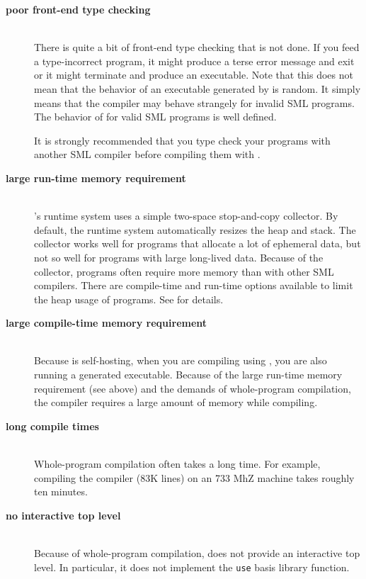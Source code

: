
\newcommand{\drawback}[1]{\item[\bf #1]\hspace{1in}\\}

\begin{description}

\drawback{poor front-end type checking}
There is quite a bit of front-end type checking that is not done.  If
you feed {\mlton} a type-incorrect program, it might produce a terse
error message and exit or it might terminate and produce an
executable.  Note that this does not mean that the behavior of an
executable generated by {\mlton} is random.  It simply means that the
compiler may behave strangely for invalid SML programs.  The behavior
of {\mlton} for valid SML programs is well defined.

It is strongly recommended that you type check your programs with
another SML compiler before compiling them with {\mlton}.

\drawback{large run-time memory requirement}
{\mlton}'s runtime system uses a simple two-space stop-and-copy
collector.  By default, the runtime system automatically resizes the
heap and stack.  The collector works well for programs that allocate a
lot of ephemeral data, but not so well for programs with large
long-lived data.  Because of the collector, programs often require
more memory than with other SML compilers.  There are compile-time and
run-time options available to limit the heap usage of programs.  See
 for details.

\drawback{large compile-time memory requirement}
Because {\mlton} is self-hosting, when you are compiling using
{\mlton}, you are also running a {\mlton} generated executable.
Because of the large run-time memory requirement (see above) and the demands of
whole-program compilation, the compiler requires a large amount of memory while
compiling.

\drawback{long compile times}
Whole-program compilation often takes a long time.  For example, compiling
the compiler (83K lines) on an 733 MhZ machine takes roughly ten minutes.

\drawback{no interactive top level}
Because of whole-program compilation, {\mlton} does not provide an
interactive top level.  In particular, it does not implement the {\tt use} basis
library function.

\end{description}
